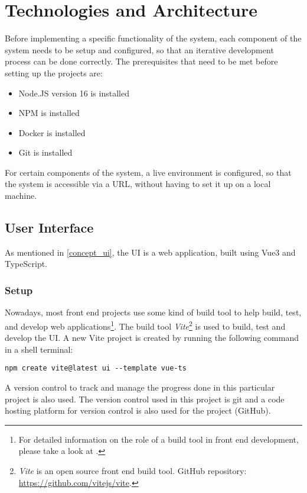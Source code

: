 \section{Technologies and Architecture}

Before implementing a specific functionality of the system, each component of the system needs to be setup and configured, so that an iterative development process can be done correctly. The prerequisites that need to be met before setting up the projects are: 

\begin{itemize}
 \item Node.JS version 16 is installed
 \item NPM is installed
 \item Docker is installed
 \item Git is installed
\end{itemize}

For certain components of the system, a live environment is configured, so that the system is accessible via a URL, without having to set it up on a local machine. 


 \subsection{User Interface}
 As mentioned in \autoref{concept_ui}, the UI is a web application, built using Vue3 and TypeScript.

  \subsubsection{Setup}
   Nowadays, most front end projects use some kind of build tool to help build, test, and develop web applications\footnote{For detailed information on the role of a build tool in front end development, please take a look at \autocite{Odell2014}.}. The build tool \emph{Vite}\footnote{\emph{Vite} is an open source front end build tool. GitHub repository: \url{https://github.com/vitejs/vite}.} is used to build, test and develop the UI. A new Vite project is created by running the following command in a shell terminal:
  
  \begin{lstlisting}[caption={Creating a new Vite project (Shell)}]
 npm create vite@latest ui --template vue-ts
  \end{lstlisting}

  A version control to track and manage the progress done in this particular project is also used. The version control used in this project is git and a code hosting platform for version control is also used for the project (GitHub).

